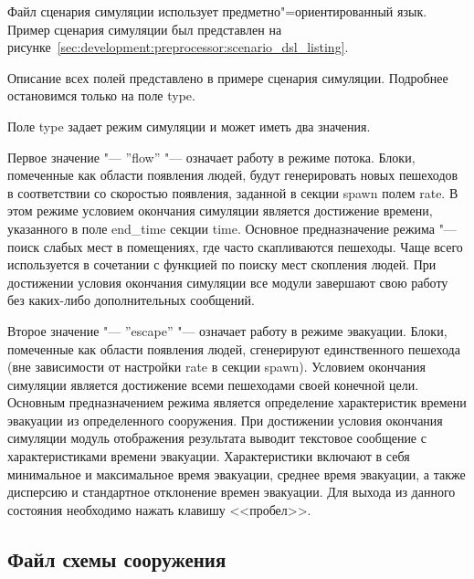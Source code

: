 Файл сценария симуляции использует предметно"=ориентированный язык.
Пример сценария симуляции был представлен на рисунке~\ref{sec:development:preprocessor:scenario_dsl_listing}.
%

Описание всех полей представлено в примере сценария симуляции. Подробнее остановимся только на поле type.

Поле type задает режим симуляции и может иметь два значения.

Первое значение "--- ''flow'' "--- означает работу в режиме потока.
Блоки, помеченные как области появления людей, будут генерировать новых пешеходов в соответствии со скоростью появления,
заданной в секции spawn полем rate.
В этом режиме условием окончания симуляции является достижение времени, указанного в поле end\_time секции time.
Основное предназначение режима "--- поиск слабых мест в помещениях, где часто скапливаются пешеходы.
Чаще всего используется в сочетании с функцией по поиску мест скопления людей.
При достижении условия окончания симуляции все модули завершают свою работу без каких-либо дополнительных сообщений.

Второе значение "--- ''escape'' "--- означает работу в режиме эвакуации.
Блоки, помеченные как области появления людей, сгенерируют единственного пешехода (вне зависимости от настройки rate в секции spawn).
Условием окончания симуляции является достижение всеми пешеходами своей конечной цели.
Основным предназначением режима является определение характеристик времени эвакуации из определенного сооружения.
При достижении условия окончания симуляции модуль отображения результата выводит текстовое сообщение с
характеристиками времени эвакуации. Характеристики включают в себя минимальное и максимальное время эвакуации,
среднее время эвакуации, а также дисперсию и стандартное отклонение времен эвакуации.
Для выхода из данного состояния необходимо нажать клавишу <<пробел>>.


\subsection{Файл схемы сооружения}
\label{sec:manual:input:building_scheme}

